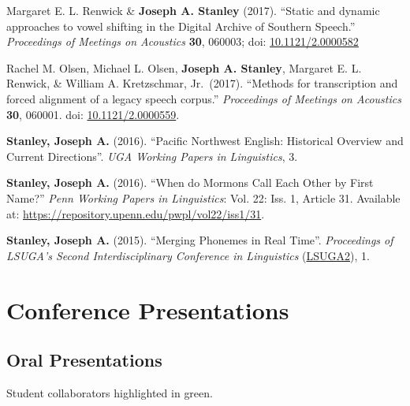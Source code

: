 \documentclass[
]{article}
\begin{document}
Margaret E. L. Renwick \& \textbf{Joseph A. Stanley} (2017). ``Static
and dynamic approaches to vowel shifting in the Digital Archive of
Southern Speech.'' \emph{Proceedings of Meetings on Acoustics}
\textbf{30}, 060003; doi:
\href{http://dx.doi.org/10.1121/2.0000582}{10.1121/2.0000582}

Rachel M. Olsen, Michael L. Olsen, \textbf{Joseph A. Stanley}, Margaret
E. L. Renwick, \& William A. Kretzschmar, Jr.~(2017). ``Methods for
transcription and forced alignment of a legacy speech corpus.''
\emph{Proceedings of Meetings on Acoustics} \textbf{30}, 060001. doi:
\href{http://dx.doi.org/10.1121/2.0000559}{10.1121/2.0000559}.

\textbf{Stanley, Joseph A.} (2016). ``Pacific Northwest English:
Historical Overview and Current Directions''. \emph{UGA Working Papers
in Linguistics}, 3.

\textbf{Stanley, Joseph A.} (2016). ``When do Mormons Call Each Other by
First Name?'' \emph{Penn Working Papers in Linguistics}: Vol. 22: Iss.
1, Article 31. Available at:
\href{http://repository.upenn.edu/pwpl/vol22/iss1/31/}{https://repository.upenn.edu/pwpl/vol22/iss1/31}.

\textbf{Stanley, Joseph A.} (2015). ``Merging Phonemes in Real Time''.
\emph{Proceedings of LSUGA's Second Interdisciplinary Conference in
Linguistics} (\href{http://www.linguistics.uga.edu/lcuga-2}{LSUGA2}), 1.

\hypertarget{conference-presentations}{%
\section{Conference Presentations}\label{conference-presentations}}

\hypertarget{oral-presentations}{%
\subsection{Oral Presentations}\label{oral-presentations}}

\begin{tcolorbox}[enhanced jigsaw, left=2mm, title=\textcolor{quarto-callout-note-color}{\faInfo}\hspace{0.5em}{Note}, leftrule=.75mm, bottomtitle=1mm, arc=.35mm, breakable, colbacktitle=quarto-callout-note-color!10!white, opacitybacktitle=0.6, colback=white, colframe=quarto-callout-note-color-frame, toptitle=1mm, bottomrule=.15mm, coltitle=black, opacityback=0, rightrule=.15mm, toprule=.15mm, titlerule=0mm]

Student collaborators highlighted in {green}.

\end{tcolorbox}
\end{document}
